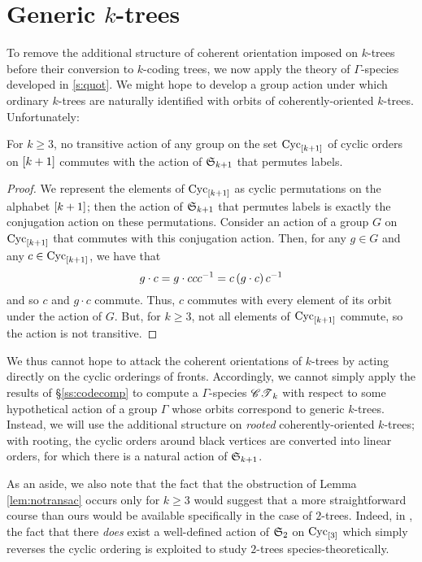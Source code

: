 \documentclass[sectionflow,singlespace,twoside,boldmathhdr,draft]{brandiss} %
\numberwithin{section}{chapter}
\numberwithin{figure}{chapter}
\begin{document}
\section{Generic $k$-trees}\label{s:genkt}
To remove the additional structure of coherent orientation imposed on $k$-trees before their conversion to $k$-coding trees, we now apply the theory of $\Gamma$-species developed in \ref{s:quot}.
We might hope to develop a group action under which ordinary $k$-trees are naturally identified with orbits of coherently-oriented $k$-trees.
Unfortunately:
\begin{lemma}
  \label{lem:notransac}
  For $k \geq 3$, no transitive action of any group on the set $\operatorname{Cyc}_{\left[ {k+1} \right]}$ of cyclic orders on $\left[ {k+1} \right]$ commutes with the action of $ \mathfrak{S}_{k+1} $ that permutes labels.
\end{lemma}
\begin{proof}
  We represent the elements of $\operatorname{Cyc}_{\left[ {k+1} \right]}$ as cyclic permutations on the alphabet $\left[ {k+1} \right]$; then the action of $ \mathfrak{S}_{k+1} $ that permutes labels is exactly the conjugation action on these permutations.
  Consider an action of a group $G$ on $\operatorname{Cyc}_{\left[ {k+1} \right]}$ that commutes with this conjugation action.
  Then, for any $g \in G$ and any $c \in \operatorname{Cyc}_{\left[ {k+1} \right]}$, we have that
  \begin{equation}
    \label{eq:transaction}
    g \cdot c = g \cdot c c c^{-1} = c \left( {g \cdot c} \right) c^{-1}
  \end{equation}
  and so $c$ and $g \cdot c$ commute.
  Thus, $c$ commutes with every element of its orbit under the action of $G$.
  But, for $k \geq 3$, not all elements of $\operatorname{Cyc}_{\left[ {k+1} \right]}$ commute, so the action is not transitive.
\end{proof}

We thus cannot hope to attack the coherent orientations of $k$-trees by acting directly on the cyclic orderings of fronts.
Accordingly, we cannot simply apply the results of \S \ref{ss:codecomp} to compute a $\Gamma$-species $\mathscr{CT}_{k}$ with respect to some hypothetical action of a group $\Gamma$ whose orbits correspond to generic $k$-trees.
Instead, we will use the additional structure on \emph{rooted} coherently-oriented $k$-trees; with rooting, the cyclic orders around black vertices are converted into linear orders, for which there is a natural action of $ \mathfrak{S}_{k+1} $.

As an aside, we also note that the fact that the obstruction of Lemma \ref{lem:notransac} occurs only for $k \geq 3$ would suggest that a more straightforward course than ours would be available specifically in the case of $2$-trees.
Indeed, in \cite{gessel:spec2trees}, the fact that there \emph{does} exist a well-defined action of $ \mathfrak{S}_{2} $ on $\operatorname{Cyc}_{\left[ {3} \right]}$ which simply reverses the cyclic ordering is exploited to study $2$-trees species-theoretically.
\end{document}
